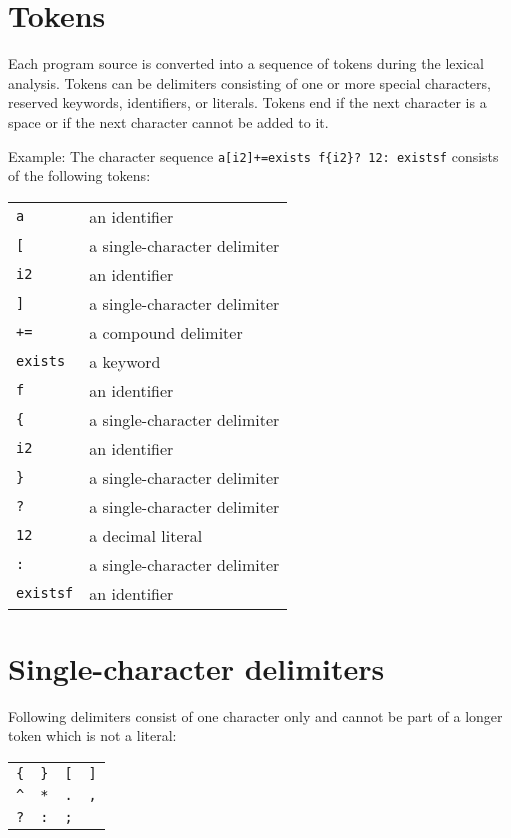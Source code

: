 \section{Tokens}

Each program source is converted into a sequence of tokens during
the lexical analysis. Tokens can be
delimiters consisting of one or more special
characters, reserved keywords,
identifiers, or literals. Tokens end if
the next character is a space or if the next character cannot be added
to it.

Example: The character sequence \lstinline!a[i2]+=exists f{i2}? 12: existsf!
consists of the following tokens:

\begin{tabular}{l l}
   \lstinline!a! & an identifier \\
   \lstinline![! & a single-character delimiter \\
   \lstinline!i2! & an identifier \\
   \lstinline!]! & a single-character delimiter \\
   \lstinline!+=! & a compound delimiter \\
   \lstinline!exists! & a keyword \\
   \lstinline!f! & an identifier \\
   \lstinline!{! & a single-character delimiter \\
   \lstinline!i2! & an identifier \\
   \lstinline!}! & a single-character delimiter \\
   \lstinline!?! & a single-character delimiter \\
   \lstinline!12! & a decimal literal \\
   \lstinline!:! & a single-character delimiter \\
   \lstinline!existsf! & an identifier \\
\end{tabular}

\section{Single-character delimiters}

Following delimiters consist of one character only and cannot
be part of a longer token which is not a literal:

\bigskip
\noindent
\begin{tabular}{l l l l}
   \lstinline!{! & \lstinline!}! & \lstinline![! & \lstinline!]! \\
   \lstinline!^! & \lstinline!*! & \lstinline!.! & \lstinline!,! \\
   \lstinline!?! & \lstinline!:! & \lstinline!;! \\
\end{tabular}

